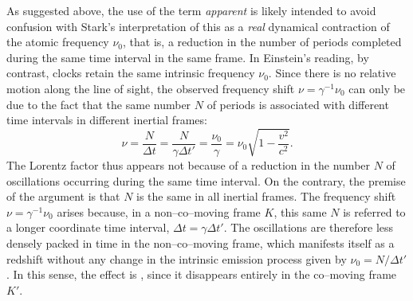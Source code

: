 \documentclass[pdflatex,sn-basic]{sn-jnl}
\newcommand{\igamma}{\ensuremath{\gamma^{-1}}\xspace}
\begin{document}
As suggested above, the use of the term \emph{apparent} is likely intended to avoid confusion with Stark’s interpretation of this  as a \emph{real} dynamical contraction of the atomic frequency $\nu_0$, that is, a reduction in the number of periods completed during the same time interval in the same frame. In Einstein’s reading, by contrast, clocks retain the same intrinsic frequency $\nu_0$. Since there is no relative motion along the line of sight, the observed frequency shift $\nu=\igamma \nu_0$ can only be due to the fact that the same number $N$ of periods is associated with different time intervals in different inertial frames:
%
\begin{equation*}
\nu = \frac{N}{\Delta t} = \frac{N}{\gamma \Delta t'} = \frac{\nu_0}{\gamma} = \nu_0 \sqrt{1-\frac{v^2}{c^2}}.
\end{equation*}
%
The Lorentz factor thus appears not because of a  reduction in the number $N$ of oscillations occurring during the same time interval. On the contrary, the premise of the argument is that $N$ is the same in all inertial frames. The frequency shift $\nu=\gamma^{-1}\nu_0$ arises because, in a non--co--moving frame $K$, this same $N$ is referred to a longer coordinate time interval, $\Delta t=\gamma \Delta t'$. The oscillations are therefore less densely packed in time in the non--co--moving frame, which manifests itself as a redshift without any change in the intrinsic emission process given by $\nu_0=N/\Delta t'$. In this sense, the effect is , since it disappears entirely in the co--moving frame $K'$.
\end{document}
